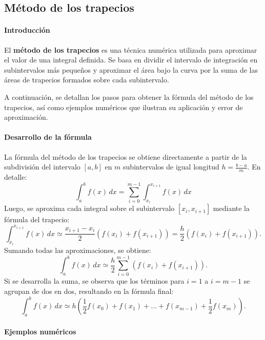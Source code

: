 \documentclass[12pt, a4paper]{article}
\theoremstyle{rioplatense}
\begin{document}
\subsection{Método de los trapecios}

\paragraph{Introducción}
El \textbf{método de los trapecios} es una técnica numérica utilizada para aproximar el valor de una integral definida. Se basa en dividir el intervalo de integración en subintervalos más pequeños y aproximar el área bajo la curva por la suma de las áreas de trapecios formados sobre cada subintervalo.

A continuación, se detallan los pasos para obtener la fórmula del método de los trapecios, así como ejemplos numéricos que ilustran su aplicación y error de aproximación.

\paragraph{Desarrollo de la fórmula}

La fórmula del método de los trapecios se obtiene directamente a partir de la subdivisión del intervalo \([a, b]\) en \(m\) subintervalos de igual longitud \(h = \frac{b-a}{m}\). En detalle:
\[
\int_a^b f(x) \, dx = \sum_{i=0}^{m-1} \int_{x_i}^{x_{i+1}} f(x) \, dx
\]
Luego, se aproxima cada integral sobre el subintervalo \([x_i, x_{i+1}]\) mediante la fórmula del trapecio:
\[
\int_{x_i}^{x_{i+1}} f(x) \, dx \simeq \frac{x_{i+1}-x_i}{2} \left( f(x_i) + f(x_{i+1}) \right) = \frac{h}{2} \left( f(x_i) + f(x_{i+1}) \right).
\]
Sumando todas las aproximaciones, se obtiene:
\[
\int_a^b f(x) \, dx \simeq \frac{h}{2} \sum_{i=0}^{m-1} \left( f(x_i) + f(x_{i+1}) \right).
\]
Si se desarrolla la suma, se observa que los términos para \(i = 1\) a \(i = m-1\) se agrupan de dos en dos, resultando en la fórmula final:
\[
\int_a^b f(x) \, dx \simeq h \left( \frac{1}{2} f(x_0) + f(x_1) + \ldots + f(x_{m-1}) + \frac{1}{2} f(x_m) \right).
\]


\paragraph{Ejemplos numéricos}
\end{document}
